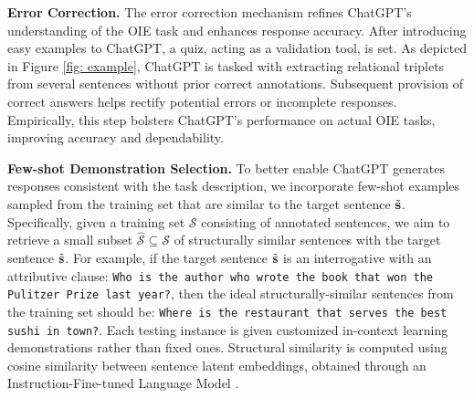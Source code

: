 \documentclass{article}
\begin{document}
\noindent\textbf{Error Correction.} The error correction mechanism refines ChatGPT's understanding of the OIE task and enhances response accuracy. After introducing easy examples to ChatGPT, a quiz, acting as a validation tool, is set. As depicted in Figure \ref{fig: example}, ChatGPT is tasked with extracting relational triplets from several sentences without prior correct annotations. Subsequent provision of correct answers helps rectify potential errors or incomplete responses. Empirically, this step bolsters ChatGPT's performance on actual OIE tasks, improving accuracy and dependability.

\noindent\textbf{Few-shot Demonstration Selection.} To better enable ChatGPT generates responses consistent with the task description, we incorporate few-shot examples sampled from the training set that are similar to the target sentence $\Tilde{\mathbf{s}}$. Specifically, given a training set $\mathcal{S}$ consisting of annotated sentences, we aim to retrieve a small subset $\hat{\mathcal{S}} \subseteq \mathcal{S}$ of structurally similar sentences with the target sentence $\Tilde{\mathbf{s}}$. For example, if the target sentence $\Tilde{\mathbf{s}}$ is an interrogative with an attributive clause: \texttt{Who is the author who wrote the book that won the Pulitzer Prize last year?}, then the ideal structurally-similar sentences from the training set should be: \texttt{Where is the restaurant that serves the best sushi in town?}. Each testing instance is given customized in-context learning demonstrations rather than fixed ones. Structural similarity is computed using cosine similarity between sentence latent embeddings, obtained through an Instruction-Fine-tuned Language Model \cite{su2022one}.
\end{document}
